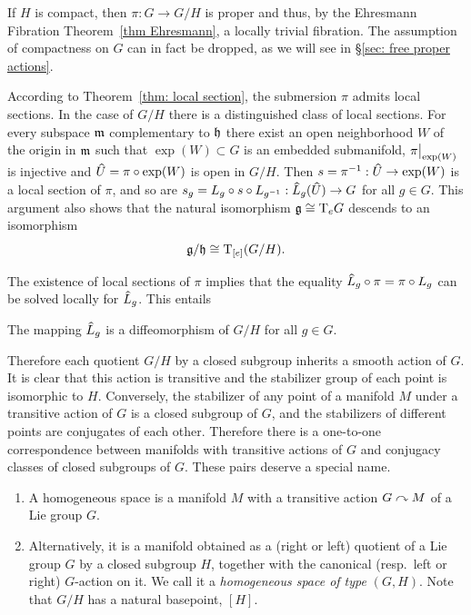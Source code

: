 \begin{rem}
    If $H$ is compact, then $\pi:G\to G\slash H$ is proper and thus, by the Ehresmann Fibration Theorem~\ref{thm Ehresmann}, a locally trivial fibration. The assumption of compactness on $G$ can in fact be dropped, as we will see in \S\ref{sec: free proper actions}.
\end{rem}

\begin{rem}
    According to Theorem~\ref{thm: local section}, the submersion $\pi$ admits local sections. In the case of $G\slash H$ there is a distinguished class of local sections. For every subspace $\mathfrak{m}$ complementary to $\mathfrak{h}$ there exist an open neighborhood $W$ of the origin in $\mathfrak{m}$ such that $\exp(W)\subset G$ is an embedded submanifold, $\restr{\pi}{\exp(W)}$ is injective and $\wh{U}=\pi\circ\exp(W)$ is open in $G\slash H$. Then $s=\pi^{-1}:\wh{U}\to \exp(W)$ is a local section of $\pi$, and so are $s_g=L_g\circ s\circ L_{g^{-1}}:\wh{L}_g(\wh{U})\to G$ for all $g\in G$. This argument also shows that the natural isomorphism $\mathfrak{g}\cong \mathrm{T}_e G$ descends to an isomorphism 
    \[\mathfrak{g}\slash \mathfrak{h}\cong \mathrm{T}_{[e]}(G\slash H).\]
\end{rem}

The existence of local sections of $\pi$ implies that the equality $\wh{L}_g\circ\pi=\pi\circ L_g$ can be solved locally for $\wh{L}_g$. This entails
\begin{cor}
    The mapping $\wh{L}_g$ is a diffeomorphism of $G\slash H$ for all $g\in G$.
\end{cor}

Therefore each quotient $G\slash H$ by a closed subgroup inherits a smooth action of $G$. It is clear that this action is transitive and the stabilizer group of each point is isomorphic to $H$. Conversely, the stabilizer of any point of a manifold $M$ under a transitive action of $G$ is a closed subgroup of $G$, and the stabilizers of different points are conjugates of each other. Therefore there is a one-to-one correspondence between manifolds with transitive actions of $G$ and conjugacy classes of closed subgroups of $G$. These pairs deserve a special name.

\begin{defn}
    \begin{enumerate}
        \item A homogeneous space is a manifold $M$ with a transitive action $G\curvearrowright M$ of a Lie group $G$. 
        \item Alternatively, it is a manifold obtained as a (right or left) quotient of a Lie group $G$ by a closed subgroup $H$, together with the canonical (resp.~left or right) $G$-action on it. We call it a \emph{homogeneous space of type} $(G,H)$. Note that $G\slash H$ has a natural basepoint, $[H]$.
    \end{enumerate}
\end{defn}


